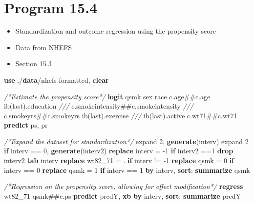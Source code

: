 \documentclass[
  10pt,
]{book}
\newenvironment{Shaded}{\begin{snugshade}}{\end{snugshade}}
\newcommand{\CommentTok}[1]{\textcolor[rgb]{0.56,0.35,0.01}{\textit{#1}}}
\newcommand{\FunctionTok}[1]{\textcolor[rgb]{0.00,0.00,0.00}{#1}}
\newcommand{\KeywordTok}[1]{\textcolor[rgb]{0.13,0.29,0.53}{\textbf{#1}}}
\newcommand{\NormalTok}[1]{#1}
\providecommand{\tightlist}{%
  \setlength{\itemsep}{0pt}\setlength{\parskip}{0pt}}
\begin{document}
\hypertarget{program-15.4-1}{%
\section{Program 15.4}\label{program-15.4-1}}

\begin{itemize}
\tightlist
\item
  Standardization and outcome regression using the propensity score
\item
  Data from NHEFS
\item
  Section 15.3
\end{itemize}

\begin{Shaded}
\begin{Highlighting}[]
\KeywordTok{use}\NormalTok{ ./}\KeywordTok{data}\NormalTok{/nhefs{-}formatted, }\KeywordTok{clear}

\CommentTok{/*Estimate the propensity score*/}
\KeywordTok{logit}\NormalTok{ qsmk sex race c.age\#\#c.age ib(}\FunctionTok{last}\NormalTok{).education }\CommentTok{///}
\NormalTok{  c.smokeintensity\#\#c.smokeintensity }\CommentTok{///}
\NormalTok{  c.smokeyrs\#\#c.smokeyrs ib(}\FunctionTok{last}\NormalTok{).exercise }\CommentTok{///}
\NormalTok{  ib(}\FunctionTok{last}\NormalTok{).active c.wt71\#\#c.wt71 }
\KeywordTok{predict}\NormalTok{ ps, pr}

\CommentTok{/*Expand the dataset for standardization*/}
\NormalTok{expand 2, }\KeywordTok{generate}\NormalTok{(interv)}
\NormalTok{expand 2 }\KeywordTok{if}\NormalTok{ interv == 0, }\KeywordTok{generate}\NormalTok{(interv2)}
\KeywordTok{replace}\NormalTok{ interv = {-}1 }\KeywordTok{if}\NormalTok{ interv2 ==1}
\KeywordTok{drop}\NormalTok{ interv2 }
\KeywordTok{tab}\NormalTok{ interv}
\KeywordTok{replace}\NormalTok{ wt82\_71 = . }\KeywordTok{if}\NormalTok{ interv != {-}1}
\KeywordTok{replace}\NormalTok{ qsmk = 0 }\KeywordTok{if}\NormalTok{ interv == 0}
\KeywordTok{replace}\NormalTok{ qsmk = 1 }\KeywordTok{if}\NormalTok{ interv == 1}
\KeywordTok{by}\NormalTok{ interv, }\KeywordTok{sort}\NormalTok{: }\KeywordTok{summarize}\NormalTok{ qsmk}

\CommentTok{/*Regression on the propensity score, allowing for effect modification*/}
\KeywordTok{regress}\NormalTok{ wt82\_71 qsmk\#\#c.ps}
\KeywordTok{predict}\NormalTok{ predY, }\KeywordTok{xb}
\KeywordTok{by}\NormalTok{ interv, }\KeywordTok{sort}\NormalTok{: }\KeywordTok{summarize}\NormalTok{ predY}


\end{Highlighting}
\end{Shaded}
\end{document}
